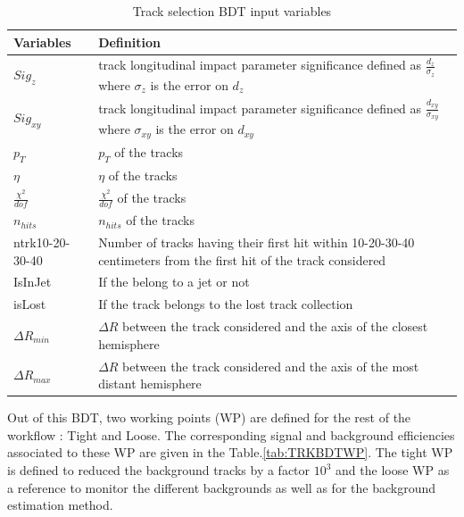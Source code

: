 \documentclass{cernatlasnote}
\begin{document}
        \begin{table}[h]
        \centering
        \begin{tabular}{|m{6cm}||m{9cm}|}
        \hline
        \rowcolor{lightgray} 
         \centering Variables & Definition\\
        \hline
        \centering $Sig_{z}$ & track longitudinal impact parameter significance defined as $\frac{d_{z}}{\sigma_{z}}$  where $\sigma_{z}$ is the error on $d_{z}$ \\
        \hline
        \centering$Sig_{xy}$ & track longitudinal impact parameter significance defined as $\frac{d_{xy}}{\sigma_{xy}}$  where $\sigma_{xy}$ is the error on $d_{xy}$ \\
        \hline
        \centering $p_{T}$  &   $p_{T}$ of the tracks \\
        \hline
        \centering $\eta$ & $\eta$ of the tracks  \\
        \hline
        \centering $\frac{\chi^2}{dof}$  &   $\frac{\chi^2}{dof}$ of the tracks\\     
        \hline
        \centering $n_{hits}$  &   $n_{hits}$ of the tracks\\
        \hline
        \centering ntrk10-20-30-40 & Number of tracks having their first hit within 10-20-30-40 centimeters from the first hit of the track considered\\
        \hline
        \centering IsInJet & If the belong to a jet or not\\
        \hline
        \centering isLost & If the track belongs to the lost track collection\\
        \hline
        \centering $\Delta R_{min}$ & $\Delta R$ between the track considered and the axis of the closest hemisphere\\
        \hline
        \centering $\Delta R_{max}$ & $\Delta R$ between the track considered and the axis of the most distant hemisphere\\
        \hline
        \end{tabular}
        \caption{Track selection BDT input variables}
        \label{tab:TRKBDTVAR}
        \end{table}
        
        Out of this BDT, two working points (WP) are defined for the rest of the workflow : Tight and Loose. The corresponding signal and background efficiencies associated to these WP are given in the Table.\ref{tab:TRKBDTWP}. The tight WP is defined to reduced the background tracks by a factor $10^3$ and the loose WP as a reference to monitor the different backgrounds as well as for the background estimation method. 
\end{document}
